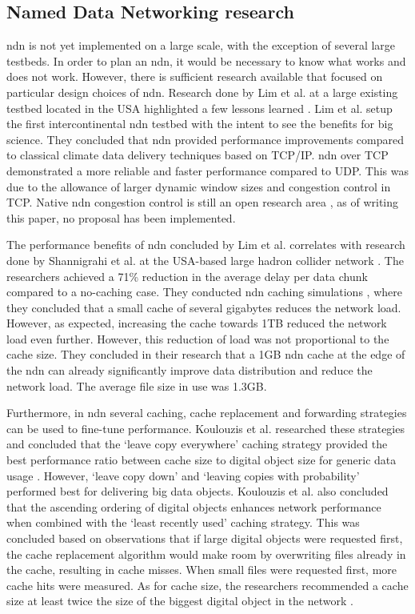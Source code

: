 \documentclass[conference]{IEEEtran}
\begin{document}
\subsection{Named Data Networking research}
\gls{ndn} is not yet implemented on a large scale, with the exception of several large testbeds. In order to plan an \gls{ndn}, it would be necessary to know what works and does not work. However, there is sufficient research available that focused on particular design choices of \gls{ndn}. Research done by Lim et al. at a large existing testbed located in the USA highlighted a few lessons learned \cite{lim2018ndn}. Lim et al. setup the first intercontinental \gls{ndn} testbed with the intent to see the benefits for big science. They concluded that \gls{ndn} provided performance improvements compared to classical climate data delivery techniques based on TCP/IP. \gls{ndn} over TCP demonstrated a more reliable and faster performance compared to UDP. This was due to the allowance of larger dynamic window sizes and congestion control in TCP. Native \gls{ndn} congestion control is still an open research area \cite{ren2016congestion}, as of writing this paper, no proposal has been implemented.

The performance benefits of \gls{ndn} concluded by Lim et al. correlates with research done by Shannigrahi et al. at the USA-based large hadron collider network \cite{shannigrahi2015named}. The researchers achieved a 71\% reduction in the average delay per data chunk compared to a no-caching case. They conducted \gls{ndn} caching simulations \cite{shannigrahi2017request}, where they concluded that a small cache of several gigabytes reduces the network load. However, as expected, increasing the cache towards 1TB reduced the network load even further. However, this reduction of load was not proportional to the cache size. They concluded in their research that a 1GB \gls{ndn} cache at the edge of the \gls{ndn} can already significantly improve data distribution and reduce the network load. The average file size in use was 1.3GB.

Furthermore, in \gls{ndn} several caching, cache replacement and forwarding strategies can be used to fine-tune performance. Koulouzis et al. researched these strategies and concluded that the `leave copy everywhere' caching strategy provided the best performance ratio between cache size to digital object size for generic data usage \cite{koulouzis2018information}. However, `leave copy down' and `leaving copies with probability' performed best for delivering big data objects. Koulouzis et al. also concluded that the ascending ordering of digital objects enhances network performance when combined with the `least recently used' caching strategy. This was concluded based on observations that if large digital objects were requested first, the cache replacement algorithm would make room by overwriting files already in the cache, resulting in cache misses. When small files were requested first, more cache hits were measured. As for cache size, the researchers recommended a cache size at least twice the size of the biggest digital object in the network \cite{koulouzis2018information}.
\end{document}
